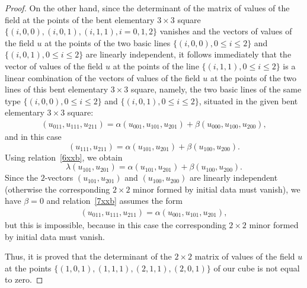 \begin{proof}
On the other hand, since the determinant of the matrix of values of
the f\/ield at the points of the bent elementary $3 \times 3$ square
$\{(i, 0, 0), (i, 0, 1), (i, 1, 1), i = 0, 1, 2\}$ vanishes and the
vectors of values of the f\/ield $u$ at the points of the two basic
lines $\{(i, 0, 0), 0 \leq i \leq 2\}$ and $\{(i, 0, 1), 0 \leq i
\leq 2\}$ are linearly independent, it follows immediately that the
vector of values of the f\/ield $u$ at the points of the line $\{(i,
1, 1), 0 \leq i \leq 2\}$ is a linear combination of the vectors of
values of the f\/ield $u$ at the points of the two lines of this bent
elementary $3 \times 3$ square, namely, the two basic lines of the
same type $\{(i, 0, 0), 0 \leq i \leq 2\}$ and $\{(i, 0, 1), 0 \leq
i \leq 2\}$, situated in the given bent elementary $3 \times 3$
square:
\begin{gather} (u_{0 1 1}, u_{1 1 1}, u_{2 1 1}) = \alpha (u_{0 0 1}, u_{1 0
1}, u_{2 0 1}) + \beta (u_{0 0 0}, u_{1 0 0}, u_{2 0 0}),
\label{7xxb}
\end{gather}
and in this case \[ (u_{1 1 1}, u_{2 1 1}) =
\alpha (u_{1 0 1}, u_{2 0 1}) + \beta (u_{1 0 0}, u_{2 0 0}). \]
Using relation~\eqref{6xxb}, we obtain \[ \lambda (u_{1 0 1}, u_{2
0 1}) = \alpha (u_{1 0 1}, u_{2 0 1}) + \beta (u_{1 0 0}, u_{2 0
0}). \] Since the $2$-vectors $(u_{1 0 1}, u_{2 0 1})$ and $(u_{1 0
0}, u_{2 0 0})$ are linearly independent (otherwise the
corresponding $2 \times 2$ minor formed by initial data must
vanish), we have $\beta = 0$ and relation~\eqref{7xxb} assumes the
form \begin{gather*} (u_{0 1 1}, u_{1 1 1}, u_{2 1 1}) = \alpha (u_{0 0 1}, u_{1
0 1}, u_{2 0 1}), %
\end{gather*} but this is impossible, because
in this case the corresponding $2 \times 2$ minor formed by initial
data must vanish.


Thus, it is proved that the determinant of the $2 \times 2$ matrix
of values of the f\/ield $u$ at the points $\{(1, 0, 1), (1, 1, 1),
(2, 1, 1), (2, 0, 1)\}$ of our cube is not equal to zero.



\end{proof}
